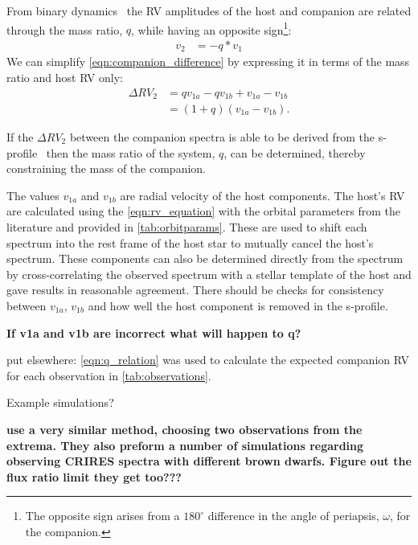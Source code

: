From binary dynamics~\citep[e.g.][]{murray_keplerian_2010} the {RV} amplitudes of the host and companion are related through the mass ratio, \(q\), while having an opposite sign\footnote{The opposite sign arises from a \(180^\circ\) difference in the angle of periapsis, \(\omega\), for the companion.}:
\begin{align}
v_{2} &= -q * v_{1} \label{eqn:q_relation}
\end{align}
We can simplify \cref{eqn:companion_difference} by expressing it in terms of the mass ratio and host {RV} only:
\begin{align}
\Delta RV_2 &= q v_{1a} - q v_{1b} + v_{1a} - v_{1b} \nonumber \\
&= (1 + q)(v_{1a} - v_{1b}). \label{eqn:companion_difference_simplified}
\end{align}

If the \(\Delta {RV}_2\) between the companion spectra is able to be derived from the s-profile~\citep[see][]{ferluga_separating_1997} then the mass ratio of the system, \(q\), can be determined, thereby constraining the mass of the companion.

The values \(v_{1a}\) and \(v_{1b}\) are radial velocity of the host components.
The host's RV are calculated using the \cref{eqn:rv_equation} with the orbital parameters from the literature and provided in \cref{tab:orbitparams}.
These are used to shift each spectrum into the rest frame of the host star to mutually cancel the host's spectrum.
These components can also be determined directly from the spectrum by cross-correlating the observed spectrum with a stellar template of the host and gave results in reasonable agreement.
There should be checks for consistency between \(v_{1a}\), \(v_{1b}\) and how well the host component is removed in the s-profile.

\textbf{If v1a and v1b are incorrect what will happen to q?}

{\red{} put elsewhere: \cref{eqn:q_relation} was used to calculate the expected companion {RV} for each observation in \cref{tab:observations}.}

Example simulations?

\textbf{\citet{kostogryz_spectral_2013} use a very similar method, choosing two observations from the extrema.
They also preform a number of simulations regarding observing CRIRES spectra with different brown dwarfs.
Figure out the flux ratio limit they get too???}

